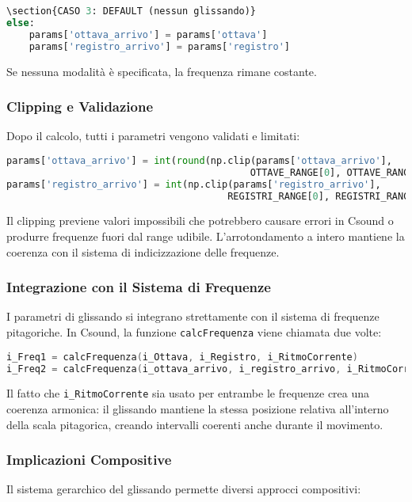 \begin{lstlisting}[language=Python]
\section{CASO 3: DEFAULT (nessun glissando)}
else:
    params['ottava_arrivo'] = params['ottava']
    params['registro_arrivo'] = params['registro']
\end{lstlisting}

Se nessuna modalità è specificata, la frequenza rimane costante.
\subsubsection{Clipping e Validazione}
Dopo il calcolo, tutti i parametri vengono validati e limitati:

\begin{lstlisting}[language=Python]
params['ottava_arrivo'] = int(round(np.clip(params['ottava_arrivo'], 
                                           OTTAVE_RANGE[0], OTTAVE_RANGE[1])))
params['registro_arrivo'] = int(np.clip(params['registro_arrivo'], 
                                       REGISTRI_RANGE[0], REGISTRI_RANGE[1]))
\end{lstlisting}

Il clipping previene valori impossibili che potrebbero causare errori in Csound o produrre frequenze fuori dal range udibile. L'arrotondamento a intero mantiene la coerenza con il sistema di indicizzazione delle frequenze.
\subsubsection{Integrazione con il Sistema di Frequenze}
I parametri di glissando si integrano strettamente con il sistema di frequenze pitagoriche. In Csound, la funzione \texttt{calcFrequenza} viene chiamata due volte:

\begin{lstlisting}[language=C]
i_Freq1 = calcFrequenza(i_Ottava, i_Registro, i_RitmoCorrente)
i_Freq2 = calcFrequenza(i_ottava_arrivo, i_registro_arrivo, i_RitmoCorrente)
\end{lstlisting}

Il fatto che \texttt{i\_RitmoCorrente} sia usato per entrambe le frequenze crea una coerenza armonica: il glissando mantiene la stessa posizione relativa all'interno della scala pitagorica, creando intervalli coerenti anche durante il movimento.
\subsubsection{Implicazioni Compositive}
Il sistema gerarchico del glissando permette diversi approcci compositivi:

